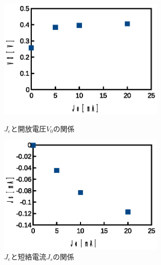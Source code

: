 \documentclass[11pt,a4]{jarticle}
\begin{document}
\begin{figure}[htbp]
 \begin{minipage}{0.5\hsize}
  \begin{center}
   \includegraphics[width=80mm]{Je_V0.eps}
  \end{center}
  \caption{$J_e$と開放電圧$V_0$の関係}
  \label{fig:Je_V0}
 \end{minipage}
 \begin{minipage}{0.5\hsize}
  \begin{center}
   \includegraphics[width=80mm]{Je_Js.eps}
  \end{center}
  \caption{$J_e$と短絡電流$J_s$の関係}
  \label{fig:Je_Js}
 \end{minipage}
\end{figure}
\end{document}
